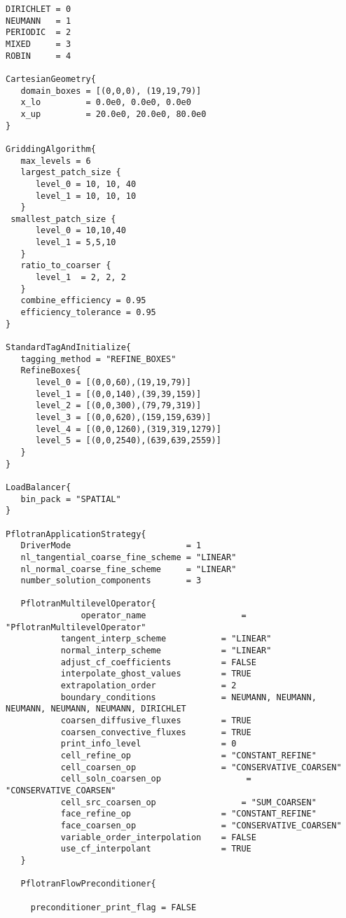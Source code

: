 \documentclass[12pt]{article}
\begin{document}
\tiny
\begin{verbatim}
DIRICHLET = 0
NEUMANN   = 1
PERIODIC  = 2
MIXED     = 3
ROBIN     = 4

CartesianGeometry{
   domain_boxes = [(0,0,0), (19,19,79)]
   x_lo         = 0.0e0, 0.0e0, 0.0e0  
   x_up         = 20.0e0, 20.0e0, 80.0e0
}

GriddingAlgorithm{
   max_levels = 6 
   largest_patch_size {
      level_0 = 10, 10, 40
      level_1 = 10, 10, 10
   }
 smallest_patch_size {
      level_0 = 10,10,40
      level_1 = 5,5,10
   }
   ratio_to_coarser {
      level_1  = 2, 2, 2
   }
   combine_efficiency = 0.95
   efficiency_tolerance = 0.95
}

StandardTagAndInitialize{
   tagging_method = "REFINE_BOXES"
   RefineBoxes{
      level_0 = [(0,0,60),(19,19,79)]
      level_1 = [(0,0,140),(39,39,159)]
      level_2 = [(0,0,300),(79,79,319)]
      level_3 = [(0,0,620),(159,159,639)]
      level_4 = [(0,0,1260),(319,319,1279)]
      level_5 = [(0,0,2540),(639,639,2559)]
   }
}

LoadBalancer{
   bin_pack = "SPATIAL"
}

PflotranApplicationStrategy{
   DriverMode                       = 1
   nl_tangential_coarse_fine_scheme = "LINEAR"
   nl_normal_coarse_fine_scheme     = "LINEAR"
   number_solution_components       = 3

   PflotranMultilevelOperator{
     	       operator_name                   = "PflotranMultilevelOperator"
	       tangent_interp_scheme           = "LINEAR"
	       normal_interp_scheme            = "LINEAR"
	       adjust_cf_coefficients          = FALSE
	       interpolate_ghost_values        = TRUE
	       extrapolation_order             = 2
	       boundary_conditions             = NEUMANN, NEUMANN, NEUMANN, NEUMANN, NEUMANN, DIRICHLET
	       coarsen_diffusive_fluxes        = TRUE
	       coarsen_convective_fluxes       = TRUE
	       print_info_level                = 0
	       cell_refine_op                  = "CONSTANT_REFINE"
	       cell_coarsen_op                 = "CONSERVATIVE_COARSEN"
	       cell_soln_coarsen_op                 = "CONSERVATIVE_COARSEN"
	       cell_src_coarsen_op                 = "SUM_COARSEN"
	       face_refine_op                  = "CONSTANT_REFINE"
	       face_coarsen_op                 = "CONSERVATIVE_COARSEN"
	       variable_order_interpolation    = FALSE
	       use_cf_interpolant              = TRUE
   }

   PflotranFlowPreconditioner{

     preconditioner_print_flag = FALSE


\end{verbatim}
\end{document}

